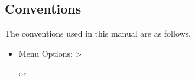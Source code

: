 \subsection{Conventions}\label{label_conventions}

The conventions used in this manual are as follows. 

\begin{itemize}
%
\item Menu Options:  > %
%

or


\end{itemize}
